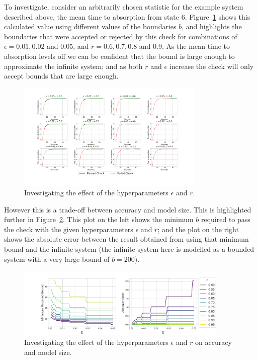 \documentclass{article}
\begin{document}
To investigate, consider an arbitrarily chosen statistic for the example system
described above, the mean time to absorption from state 6.
Figure~\ref{fig:investigate_hyperparameters} shows this calculated value using
different values of the boundaries $b$, and highlights the boundaries that were
accepted or rejected by this check for combinations of $\epsilon = 0.01, 0.02$
and $0.05$, and $r = 0.6, 0.7, 0.8$ and $0.9$.
As the mean time to absorption levels off we can be confident that the bound is
large enough to approximate the infinite system; and as both $r$ and $\epsilon$
increase the check will only accept bounds that are large enough.

\begin{figure}
  \begin{center}
    \includegraphics[width=0.8\textwidth]{img/check_hyperparameters_effect.pdf}
  \end{center}
  \caption{Investigating the effect of the hyperparameters $\epsilon$ and $r$.}
  \label{fig:investigate_hyperparameters}
\end{figure}

However this is a trade-off between accuracy and model size.
This is highlighted further in Figure~\ref{fig:summary_hyperparameters}.
This plot on the left shows the minimum $b$ required to pass the check with the
given hyperparameters $\epsilon$ and $r$; and the plot on the right shows the
absolute error between the result obtained from using that minimum bound and the
infinite system (the infinite system here is modelled as a bounded system with a
very large bound of $b = 200$).

\begin{figure}
  \begin{center}
    \includegraphics[width=0.9\textwidth]{img/check_hyperparameters_effect_summary.pdf}
  \end{center}
  \caption{Investigating the effect of the hyperparameters $\epsilon$ and $r$ on
  accuracy and model size.}
  \label{fig:summary_hyperparameters}
\end{figure}
\end{document}
